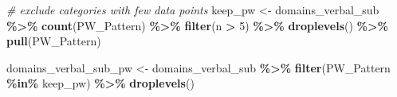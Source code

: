 \documentclass[
]{article}
\newenvironment{Shaded}{\begin{snugshade}}{\end{snugshade}}
\newcommand{\CommentTok}[1]{\textcolor[rgb]{0.56,0.35,0.01}{\textit{#1}}}
\newcommand{\DecValTok}[1]{\textcolor[rgb]{0.00,0.00,0.81}{#1}}
\newcommand{\FunctionTok}[1]{\textcolor[rgb]{0.13,0.29,0.53}{\textbf{#1}}}
\newcommand{\NormalTok}[1]{#1}
\newcommand{\OtherTok}[1]{\textcolor[rgb]{0.56,0.35,0.01}{#1}}
\newcommand{\SpecialCharTok}[1]{\textcolor[rgb]{0.81,0.36,0.00}{\textbf{#1}}}
\begin{document}
\begin{Shaded}
\begin{Highlighting}[]
\CommentTok{\# exclude categories with few data points}
\NormalTok{keep\_pw }\OtherTok{\textless{}{-}}\NormalTok{ domains\_verbal\_sub }\SpecialCharTok{\%\textgreater{}\%}
  \FunctionTok{count}\NormalTok{(PW\_Pattern) }\SpecialCharTok{\%\textgreater{}\%}
  \FunctionTok{filter}\NormalTok{(n }\SpecialCharTok{\textgreater{}} \DecValTok{5}\NormalTok{) }\SpecialCharTok{\%\textgreater{}\%}
  \FunctionTok{droplevels}\NormalTok{() }\SpecialCharTok{\%\textgreater{}\%}
  \FunctionTok{pull}\NormalTok{(PW\_Pattern)}

\NormalTok{domains\_verbal\_sub\_pw }\OtherTok{\textless{}{-}}\NormalTok{ domains\_verbal\_sub }\SpecialCharTok{\%\textgreater{}\%}
  \FunctionTok{filter}\NormalTok{(PW\_Pattern }\SpecialCharTok{\%in\%}\NormalTok{ keep\_pw) }\SpecialCharTok{\%\textgreater{}\%}
  \FunctionTok{droplevels}\NormalTok{()}


\end{Highlighting}
\end{Shaded}
\end{document}
